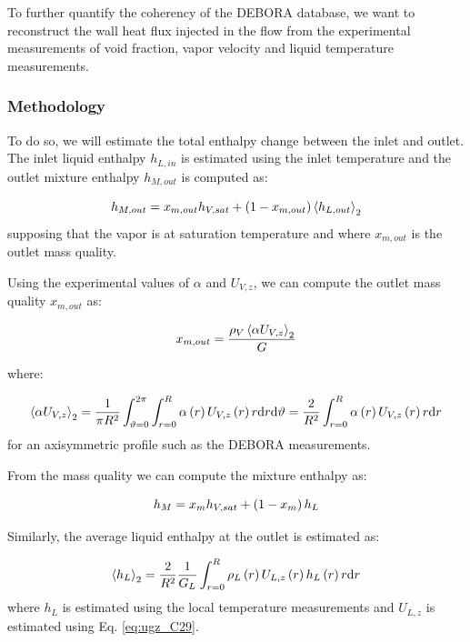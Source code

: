 To further quantify the coherency of the DEBORA database, we want to reconstruct the wall heat flux injected in the flow from the experimental measurements of void fraction, vapor velocity and liquid temperature measurements.

\subsubsection{Methodology}

To do so, we will estimate the total enthalpy change between the inlet and outlet. The inlet liquid enthalpy $h_{L,in}$ is estimated using the inlet temperature and the outlet mixture enthalpy $h_{M,out}$ is computed as:

\begin{equation}
h_{M,out}=x_{m,out}h_{V,sat}+\left( 1-x_{m,out} \right)\left< h_{L,out} \right>_{2}
\end{equation}
supposing that the vapor is at saturation temperature and where $x_{m,out}$ is the outlet mass quality.

\npar
Using the experimental values of $\alpha$ and $U_{V,z}$, we can compute the outlet mass quality $x_{m,out}$ as:

\begin{equation}
x_{m,out} = \frac{\rho_{V}\left< \alpha U_{V,z} \right>_{2}}{G}
\end{equation}

where:

\begin{equation}
\left< \alpha U_{V,z} \right>_{2} = \frac{1}{\pi R^{2}}\int_{\vartheta=0}^{2\pi} \int_{r=0}^{R} \alpha\left( r \right) U_{V,z}\left( r \right) r \mathrm{d}r \mathrm{d}\vartheta = \frac{2}{R^{2}}\int_{r=0}^{R}  \alpha\left( r \right) U_{V,z}\left( r \right) r \mathrm{d}r
\end{equation}
for an axisymmetric profile such as the DEBORA measurements.

\npar

From the mass quality we can compute the mixture enthalpy as:

\begin{equation}
h_{M} = x_{m} h_{V,sat} + \left( 1-x_{m} \right)h_{L}
\end{equation}

\npar
Similarly, the average liquid enthalpy at the outlet is estimated as:

\begin{equation}
\left< h_{L} \right>_{2} = \frac{2}{R^{2}}\frac{1}{G_{L}}\int_{r=0}^{R} \rho_{L}\left( r \right) U_{L,z}\left( r \right) h_{L}\left( r \right) r \mathrm{d}r
\end{equation}
where $h_{L}$ is estimated using the local temperature measurements and $U_{L,z}$ is estimated using Eq. \ref{eq:ugz_C29}.



